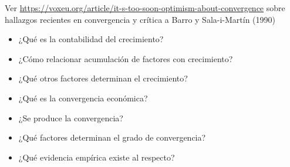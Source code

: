 \documentclass{nuevotema}
\begin{document}
\ideaclave

Ver \url{https://voxeu.org/article/it-s-too-soon-optimism-about-convergence} sobre hallazgos recientes en convergencia y crítica a Barro y Sala-i-Martín (1990)

\begin{itemize}
	\item ¿Qué es la contabilidad del crecimiento?
	\item ¿Cómo relacionar acumulación de factores con crecimiento?
	\item ¿Qué otros factores determinan el crecimiento?
	\item ¿Qué es la convergencia económica?
	\item ¿Se produce la convergencia?
	\item ¿Qué factores determinan el grado de convergencia?
	\item ¿Qué evidencia empírica existe al respecto?
\end{itemize}

\esquemacorto
\end{document}
